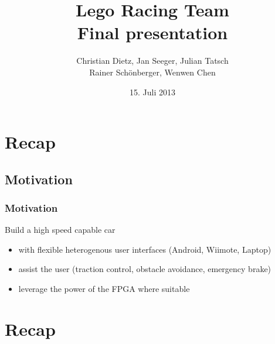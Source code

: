 \documentclass[pdf]{beamer}
\begin{document}
\title[Lego Racing Team]{Lego Racing Team\\\small{Final presentation}}
\author[...]{Christian Dietz, Jan Seeger, Julian Tatsch \\ Rainer Sch\"{o}nberger, Wenwen Chen\\}
\date{15. Juli 2013}

\subject{Final presentation}

\frame{
 \titlepage
}



\section{Recap}
\subsection{Motivation}
\begin{frame}
\frametitle{Motivation}
\begin{exampleblock}{Build a high speed capable car}
\begin{itemize}
  \item with flexible heterogenous user interfaces (Android, Wiimote, Laptop)
  \item assist the user (traction control, obstacle avoidance, emergency brake)
  \item leverage the power of the FPGA where suitable
\end{itemize}
\end{exampleblock}
\end{frame}

\section{Recap}
\end{document}
